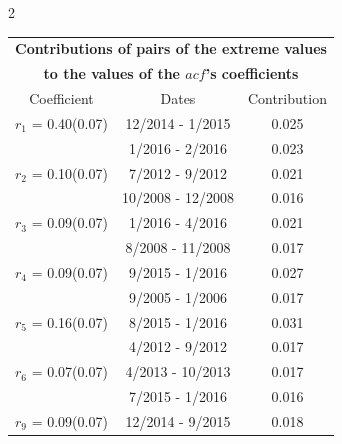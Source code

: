 
\thispagestyle{empty}
\begin{multicols}{2}{ 
\begin{tabular}{ccc}
\multicolumn{3}{c}{\textbf{Contributions of pairs of the extreme values} }  \vspace{-.10in}  \\ 
\multicolumn{3}{c}{ \textbf{to the values of the $acf$'s coefficients}} \\ 
\hline 
\hline                  Coefficient  &  Dates &  Contribution \\ 
\hline 
  $r_{ 1}$ = 0.40(0.07) &      12/2014 -  1/2015 &        0.025   \vspace{-.10in} \\  
&        1/2016 -  2/2016 &        0.023  \vspace{-.02in} \\ \hline 
  $r_{ 2}$ = 0.10(0.07) &       7/2012 -  9/2012 &        0.021   \vspace{-.10in} \\  
&       10/2008 - 12/2008 &        0.016  \vspace{-.02in} \\ \hline 
  $r_{ 3}$ = 0.09(0.07) &       1/2016 -  4/2016 &        0.021   \vspace{-.10in} \\  
&        8/2008 - 11/2008 &        0.017  \vspace{-.02in} \\ \hline 
  $r_{ 4}$ = 0.09(0.07) &       9/2015 -  1/2016 &        0.027   \vspace{-.10in} \\  
&        9/2005 -  1/2006 &        0.017  \vspace{-.02in} \\ \hline 
  $r_{ 5}$ = 0.16(0.07) &       8/2015 -  1/2016 &        0.031   \vspace{-.10in} \\  
&        4/2012 -  9/2012 &        0.017  \vspace{-.02in} \\ \hline 
  $r_{ 6}$ = 0.07(0.07) &       4/2013 - 10/2013 &        0.017   \vspace{-.10in} \\  
&        7/2015 -  1/2016 &        0.016  \vspace{-.02in} \\ \hline 
  $r_{ 9}$ = 0.09(0.07) &      12/2014 -  9/2015 &        0.018   \vspace{-.10in} \\  

\end{tabular}}
\end{multicols}
